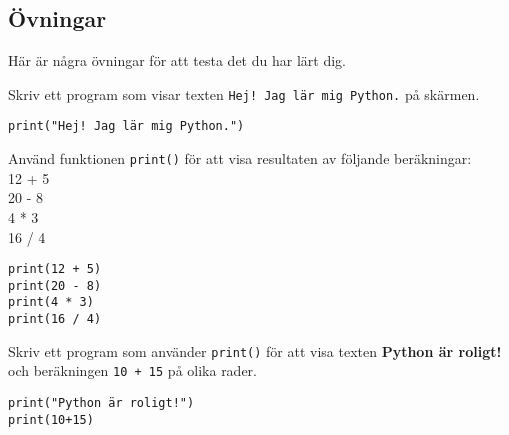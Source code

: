 \subsection{Övningar}
Här är några övningar för att testa det du har lärt dig.

\begin{exercise}
Skriv ett program som visar texten \texttt{Hej! Jag lär mig Python.} på skärmen.
\end{exercise}
\begin{solution}
\begin{lstlisting}
print("Hej! Jag lär mig Python.")
\end{lstlisting}

\end{solution}

\begin{exercise}
Använd funktionen \texttt{print()} för att visa resultaten av följande beräkningar: \\
12 + 5 \\
20 - 8 \\ 
4 * 3 \\
16 / 4 \\
\end{exercise}
\begin{solution}

\begin{lstlisting}
print(12 + 5)
print(20 - 8)
print(4 * 3)
print(16 / 4)
\end{lstlisting}


\end{solution}

\begin{exercise}
Skriv ett program som använder \texttt{print()} för att visa texten \textbf{Python är roligt!} och beräkningen \texttt{10 + 15} på olika rader.
\end{exercise}
\begin{solution}

\begin{lstlisting}
print("Python är roligt!")
print(10+15)
\end{lstlisting}

\end{solution}


